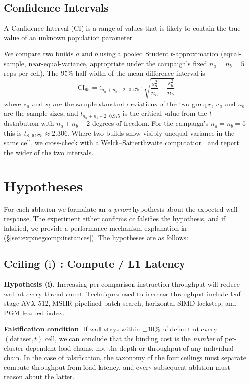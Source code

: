 \subsection{Confidence Intervals\label{sec:method:ci}}

A Confidence Interval (CI) is a range of values that is likely to contain the true value of an unknown population parameter.

We compare two builds $a$ and $b$ using a pooled Student $t$-approximation (equal-sample, near-equal-variance, appropriate under the campaign's fixed $n_a=n_b=5$ reps per cell). The $95\%$ half-width of the mean-difference interval is
\[
\text{CI}_{95} = t_{n_a + n_b - 2,\;0.975} \cdot \sqrt{\frac{s_a^2}{n_a} + \frac{s_b^2}{n_b}}
\]
where $s_a$ and $s_b$ are the sample standard deviations of the two groups, $n_a$ and $n_b$ are the sample sizes, and $t_{n_a+n_b-2,\,0.975}$ is the critical value from the $t$-distribution with $n_a+n_b-2$ degrees of freedom. For the campaign's $n_a=n_b=5$ this is $t_{8,\,0.975} \approx 2.306$. Where two builds show visibly unequal variance in the same cell, we cross-check with a Welch--Satterthwaite computation~\cite{welch_1947,satterthwaite_1946} and report the wider of the two intervals.


\section{Hypotheses\label{sec:method:hypotheses}}

For each ablation we formulate an \emph{a-priori} hypothesis about the expected wall response. The experiment either confirms or falsifies the hypothesis, and if falsified, we provide a performance mechanism explanation in (§\ref{sec:exp:negcomp:instances}). The hypotheses are as follows:

\subsection{Ceiling (i)  :  Compute / L1 Latency}

\textbf{Hypothesis (i).} Increasing per-comparison instruction throughput will reduce wall at every thread count. Techniques used to increase throughput include leaf-stage AVX-512, MSHR-pipelined batch search, horizontal-SIMD lockstep, and PGM learned index.

\textbf{Falsification condition.} If wall stays within $\pm 10\%$ of default at every $(\text{dataset}, t)$ cell, we can conclude that the binding cost is the \emph{number} of per-cluster dependent-load chains, not the depth or throughput of any individual chain. In the case of falsification, the taxonomy of the four ceilings must separate compute throughput from load-latency, and every subsequent ablation must reason about the latter.

